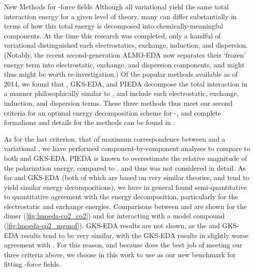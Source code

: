 \begin{section}{New Methods for \cus-\mof force fields}
Although all variational \edas yield the same
total interaction energy for a given level of theory, many \edas can differ substantially in terms of how
this total energy is decomposed into chemically-meaningful components. At the
time this research was completed, only a handful of variational \edas distinguished each
electrostatics, exchange, induction, and dispersion. (Notably, the recent
second-generation ALMO-EDA\cite{Horn2016b} now
separates their `frozen' energy term into electrostatic, exchange, and
dispersion components, and might thus might be worth re-investigation.) Of the
popular \eda methods available as of 2014, we found that
\lmoeda,\cite{Su2009,Chen2010}
GKS-EDA,\cite{Su2014} and PIEDA\cite{Fedorov2006} decompose the total
interaction in a manner philosophically similar to \sapt, and include each
electrostatic, exchange, induction, and dispersion terms. These three methods
thus meet our second criteria for
an optimal energy decomposition scheme for \cus-\mofs, and complete formalisms and
details for the methods can be found in .

As for the last criterion, that of maximum correspondence between \sapt and a
variational \eda, we have performed component-by-component analyses
to compare \sapt to both \lmoeda and GKS-EDA. PIEDA is known to
overestimate the relative magnitude of the polarization energy, compared to
\sapt, and thus was not considered in detail.\cite{Pastorczak2017} As for
\lmoeda and GKS-EDA (both of which are based on very similar theories, and
tend to yield similar energy decompositions), we have in
general found semi-quantitative to quantitative agreement with the \sapt
energy decomposition, particularly for the electrostatic and exchange
energies. Comparisons between \lmoeda and \sapt are shown for the \co dimer
(\cref{fig:lmoeda-co2_co2}) and for \co interacting with a model \mgmof
compound (\cref{fig:lmoeda-co2_mgmof}). GKS-EDA results are not shown, as
the \lmoeda and GKS-EDA results tend to be very similar, with the GKS-EDA
results in slightly worse agreement with \sapt. For this reason, and because
\lmoeda does the best job of meeting our three criteria above, we choose in
this work to use \lmoeda as our new benchmark \eda for fitting \cus-\mof force
fields.



\end{section}

